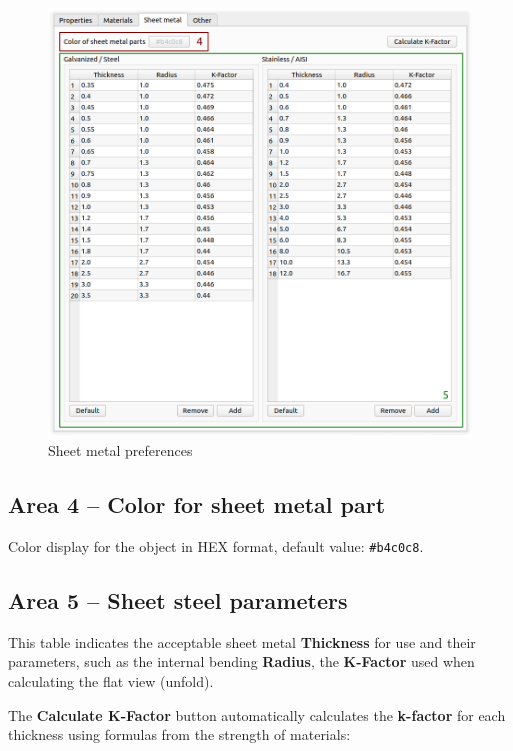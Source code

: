 \documentclass[a4paper,12pt]{article}
\begin{document}
\begin{figure}[htp]
	\centering
	\includegraphics[width=1\textwidth]{img/pref_sm.png}
	\caption{Sheet metal preferences}
	\label{sec:pref_sm}
\end{figure}

\subsection{Area 4 -- Color for sheet metal part}
Color display for the object in HEX format, default value: \verb|#b4c0c8|.

\subsection{Area 5 -- Sheet steel parameters}
This table indicates the acceptable sheet metal \textbf{Thickness} for use and their parameters, such as the internal bending \textbf{Radius}, the \textbf{K-Factor} used when calculating the flat view (unfold).\\

\pagebreak

The \textbf{Calculate K-Factor} button automatically calculates the \textbf{k-factor} for each thickness using formulas from the strength of materials:
\end{document}
